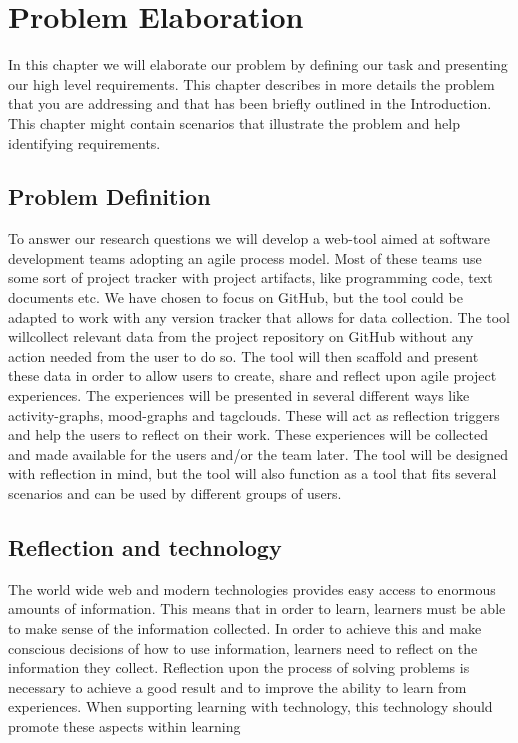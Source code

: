 \chapter{Problem Elaboration}
\label{problemelaboration}
In this chapter we will elaborate our problem by defining our task and presenting our high level requirements.
This chapter describes in more details the problem that you are addressing and that
has been briefly outlined in the Introduction. This chapter might contain scenarios that
illustrate the problem and help identifying requirements.

\section{Problem Definition}
\label{problemdefinition}

To answer our research questions we will develop a web-tool aimed at software development teams adopting an agile process model. Most of these teams use some sort of project tracker with project artifacts, like programming code, text documents etc. We have chosen to focus on GitHub, but the tool could be adapted to work with any version tracker that allows for data collection. The tool willcollect relevant data from the project repository on GitHub without any action needed from the user to do so. The tool will then scaffold and present these data in order to allow users to create, share and reflect upon agile project experiences.
The experiences will be presented in several different ways like activity-graphs, mood-graphs and tagclouds. These will act as reflection triggers and help the users to reflect on their work. These experiences will be collected and made available for the users and/or the team later. The tool will be designed with reflection in mind, but the tool will also function as 
a tool that fits several scenarios and can be used by different groups of users. 

\section{Reflection and technology}
The world wide web and modern technologies provides easy access to enormous amounts of information. This means that in order to learn, learners must be able to make sense of the information collected.  
In order to achieve this and make conscious decisions of how to use information, learners need to reflect on the information they collect. Reflection upon the process of solving problems is necessary to achieve a good result and to improve the ability to learn from experiences. When supporting learning with technology, this technology should promote these aspects within learning\cite{Lin1999}


